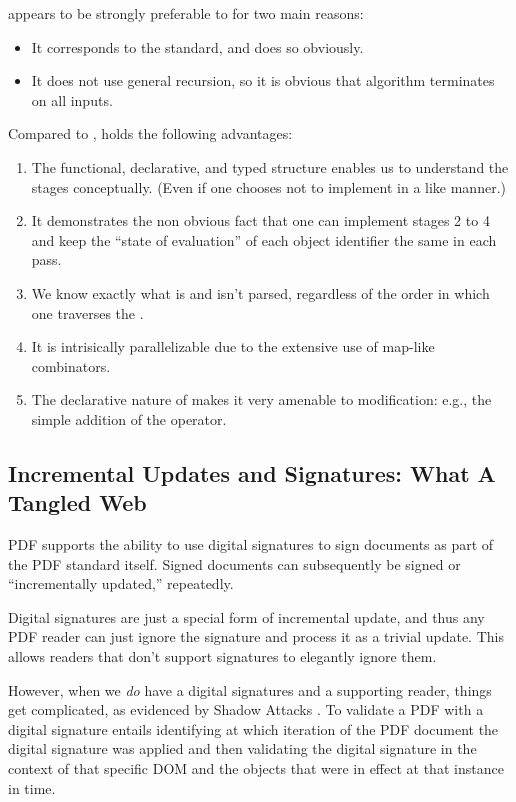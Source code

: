 \ssp{} appears to be strongly preferable to \dsp{} for two main reasons:
\begin{itemize}
\item It corresponds to the standard, and does so obviously.
\item It does not use general recursion, so it is obvious that \ssp{}
  algorithm terminates on all inputs.
\end{itemize}
Compared to \dsp{}, \ssp{} holds the following advantages:
\begin{enumerate}
\item The functional, declarative, and typed structure enables
  us to understand the stages conceptually.  (Even if one chooses
  not to implement in a like manner.)
\item It demonstrates the non obvious fact that one can
  implement stages 2 to 4 and keep the ``state of evaluation'' of each object identifier the same in each pass.
\item We know exactly what is and isn't parsed, regardless of the
  order in which one traverses the .
\item It is intrisically parallelizable due to the extensive use of
  map-like combinators.
\item The declarative nature of \ssp{} makes it very amenable to
  modification: e.g., the simple addition of the 
  operator.
\end{enumerate}


\subsection{Incremental Updates and Signatures: What A Tangled Web}
\label{sec:updates-and-signatures}

PDF supports the ability to use digital signatures to sign documents
as part of the PDF standard itself.  Signed documents can
subsequently be signed or ``incrementally updated,'' repeatedly.

Digital signatures are just a special form of incremental update, and
thus any PDF reader can just ignore the signature and process it as a
trivial update.  This allows readers that don't support signatures to
elegantly ignore them.

However, when we \emph{do} have a digital signatures and a supporting
reader, things get complicated, as evidenced by Shadow Attacks
\cite{mladenovTrillionDollarRefund2019,ndsssymposiumNDSS2021Shadow2021}.
%
To validate a PDF with a digital signature entails identifying at
which iteration of the PDF document the digital signature was applied
and then validating the digital signature in the context of that
specific DOM and the objects that were in effect at that instance in
time.

